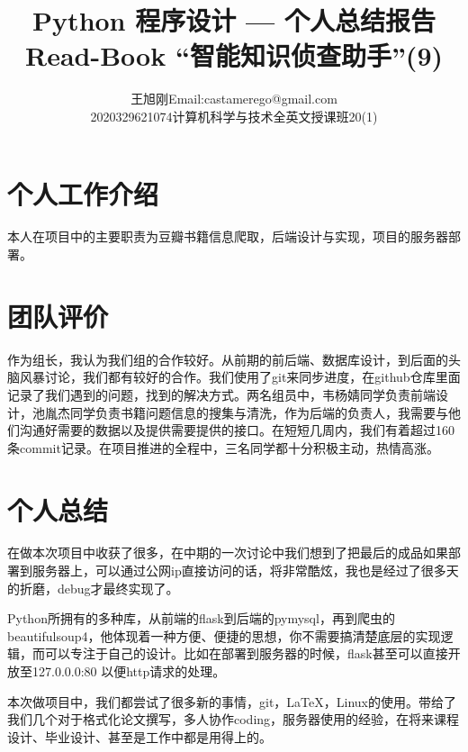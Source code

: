 \documentclass[twoside,11pt]{article}
\makeatletter
\newcommand\studentName{王旭刚}
\newcommand\studentEmail{Email:castamerego@gmail.com}
\newcommand\studentNumber{2020329621074}
\newcommand\studentClass{计算机科学与技术全英文授课班20(1)}
\makeatother
\begin{document}
\title{\Huge Python 程序设计 --- 个人总结报告 \\ \huge Read-Book ``智能知识侦查助手''(9) }

\author{\name \studentName \email \studentEmail \\
    \studentNumber \class  \studentClass
}

\maketitle

\section{个人工作介绍}
本人在项目中的主要职责为豆瓣书籍信息爬取，后端设计与实现，项目的服务器部署。

\section{团队评价}
作为组长，我认为我们组的合作较好。从前期的前后端、数据库设计，到后面的头脑风暴讨论，我们都有较好的合作。我们使用了git来同步进度，在github仓库里面记录了我们遇到的问题，找到的解决方式。两名组员中，韦杨婧同学负责前端设计，池胤杰同学负责书籍问题信息的搜集与清洗，作为后端的负责人，我需要与他们沟通好需要的数据以及提供需要提供的接口。在短短几周内，我们有着超过160条commit记录。在项目推进的全程中，三名同学都十分积极主动，热情高涨。

\section{个人总结}
在做本次项目中收获了很多，在中期的一次讨论中我们想到了把最后的成品如果部署到服务器上，可以通过公网ip直接访问的话，将非常酷炫，我也是经过了很多天的折磨，debug才最终实现了。

Python所拥有的多种库，从前端的flask到后端的pymysql，再到爬虫的beautifulsoup4，他体现着一种方便、便捷的思想，你不需要搞清楚底层的实现逻辑，而可以专注于自己的设计。比如在部署到服务器的时候，flask甚至可以直接开放至127.0.0.0:80 以便http请求的处理。


本次做项目中，我们都尝试了很多新的事情，git，\LaTeX，Linux的使用。带给了我们几个对于格式化论文撰写，多人协作coding，服务器使用的经验，在将来课程设计、毕业设计、甚至是工作中都是用得上的。
\thispagestyle{empty}
\end{document}
